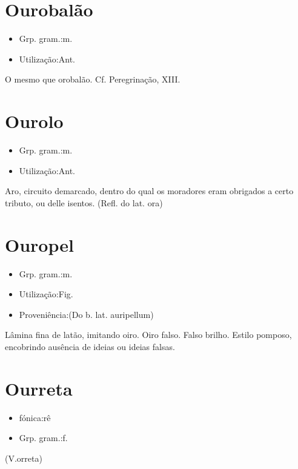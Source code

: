 \section{Ourobalão}
\begin{itemize}
\item {Grp. gram.:m.}
\end{itemize}
\begin{itemize}
\item {Utilização:Ant.}
\end{itemize}
O mesmo que \textunderscore orobalão\textunderscore . Cf. \textunderscore Peregrinação\textunderscore , XIII.
\section{Ourolo}
\begin{itemize}
\item {Grp. gram.:m.}
\end{itemize}
\begin{itemize}
\item {Utilização:Ant.}
\end{itemize}
Aro, circuito demarcado, dentro do qual os moradores eram obrigados a certo tributo, ou delle isentos.
(Refl. do lat. \textunderscore ora\textunderscore )
\section{Ouropel}
\begin{itemize}
\item {Grp. gram.:m.}
\end{itemize}
\begin{itemize}
\item {Utilização:Fig.}
\end{itemize}
\begin{itemize}
\item {Proveniência:(Do b. lat. \textunderscore auripellum\textunderscore )}
\end{itemize}
Lâmina fina de latão, imitando oiro.
Oiro falso.
Falso brilho.
Estilo pomposo, encobrindo ausência de ideias ou ideias falsas.
\section{Ourreta}
\begin{itemize}
\item {fónica:rê}
\end{itemize}
\begin{itemize}
\item {Grp. gram.:f.}
\end{itemize}
(V.orreta)
